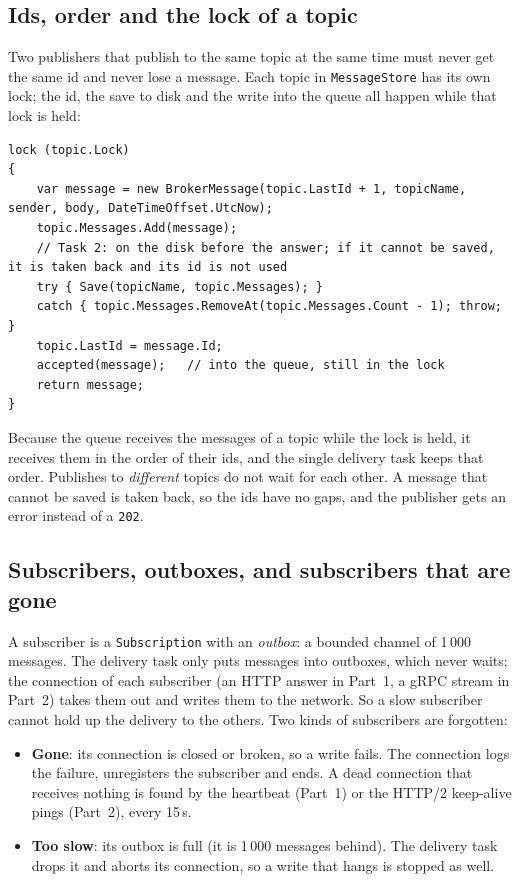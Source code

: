 \documentclass[11pt,a4paper]{article}
\newcommand{\code}[1]{{\frenchspacing\texttt{#1}}}
\begin{document}
\subsection{Ids, order and the lock of a topic}

Two publishers that publish to the same topic at the same time must never get the same id and never
lose a message. Each topic in \code{MessageStore} has its own lock; the id, the save to disk and the
write into the queue all happen while that lock is held:

\begin{lstlisting}[language=CSharp]
lock (topic.Lock)
{
    var message = new BrokerMessage(topic.LastId + 1, topicName, sender, body, DateTimeOffset.UtcNow);
    topic.Messages.Add(message);
    // Task 2: on the disk before the answer; if it cannot be saved, it is taken back and its id is not used
    try { Save(topicName, topic.Messages); }
    catch { topic.Messages.RemoveAt(topic.Messages.Count - 1); throw; }
    topic.LastId = message.Id;
    accepted(message);   // into the queue, still in the lock
    return message;
}
\end{lstlisting}

Because the queue receives the messages of a topic while the lock is held, it receives them in the
order of their ids, and the single delivery task keeps that order. Publishes to \emph{different}
topics do not wait for each other. A message that cannot be saved is taken back, so the ids have no
gaps, and the publisher gets an error instead of a \code{202}.

\subsection{Subscribers, outboxes, and subscribers that are gone}

A subscriber is a \code{Subscription} with an \emph{outbox}: a bounded channel of 1\,000 messages.
The delivery task only puts messages into outboxes, which never waits; the connection of each
subscriber (an HTTP answer in Part~1, a gRPC stream in Part~2) takes them out and writes them to the
network. So a slow subscriber cannot hold up the delivery to the others. Two kinds of subscribers
are forgotten:

\begin{itemize}
\item \textbf{Gone}: its connection is closed or broken, so a write fails. The connection logs the
  failure, unregisters the subscriber and ends. A dead connection that receives nothing is found by
  the heartbeat (Part~1) or the HTTP/2 keep-alive pings (Part~2), every 15\,s.
\item \textbf{Too slow}: its outbox is full (it is 1\,000 messages behind). The delivery task drops it
  and aborts its connection, so a write that hangs is stopped as well.
\end{itemize}
\end{document}
